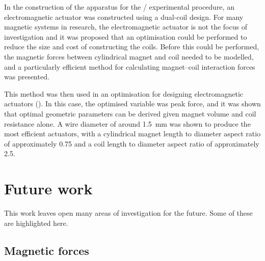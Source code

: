 \documentclass[10pt,a4paper]{memoir}
\begin{document}
In the construction of the apparatus for the \qzs/ experimental procedure, an electromagnetic actuator was constructed using a dual-coil design.
For many magnetic systems in research, the electromagnetic actuator is not the focus of investigation and it was proposed that an optimisation could be performed to reduce the size and cost of constructing the coils.
Before this could be performed, the magnetic forces between cylindrical magnet and coil needed to be modelled, and a particularly efficient method for calculating magnet--coil interaction forces was presented.

This method was then used in an optimisation for designing electromagnetic actuators ().
In this case, the optimised variable was peak force, and it was shown that optimal geometric parameters can be derived given magnet volume and coil resistance alone.
A wire diameter of around \SI{1.5}{mm} was shown to produce the most efficient actuators, with a cylindrical magnet length to diameter aspect ratio of approximately \num{0.75} and a coil length to diameter aspect ratio of approximately \num{2.5}.

\section{Future work}

This work leaves open many areas of investigation for the future.
Some of these are highlighted here.

\subsection{Magnetic forces}
\end{document}
